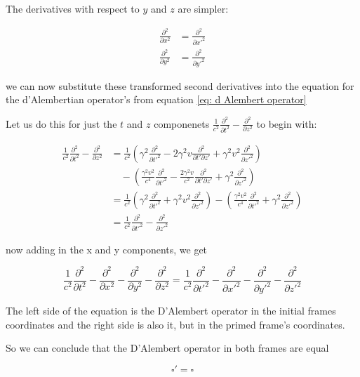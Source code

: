 \begin{derivation}
	The derivatives with respect to $y$ and $z$ are simpler:

	\begin{equation}
		\begin{aligned}
			\frac{\partial^2}{\partial x^2} & = \frac{\partial^2}{\partial x'^2} \\
			\frac{\partial^2}{\partial y^2} & = \frac{\partial^2}{\partial y'^2}
		\end{aligned}
	\end{equation}

	we can now substitute these transformed second derivatives into the equation for the d'Alembertian operator's from equation \eqref{eq: d Alembert operator}

	Let us do this for just the $t$ and $z$ componenets $\frac{1}{c^2}\frac{\partial^2}{\partial t^2} - \frac{\partial^2}{\partial z^2}$ to begin with:

	\begin{equation}
		\begin{aligned}
			\frac{1}{c^2}\frac{\partial^2}{\partial t^2} - \frac{\partial^2}{\partial z^2}
			 & = \frac{1}{c^2}\left(\gamma^2 \frac{\partial^2}{\partial t'^2} - 2\gamma^2 v \frac{\partial^2}{\partial t'\partial z'} + \gamma^2 v^2 \frac{\partial^2}{\partial z'^2}\right)                                                              \\
			 & \quad - \left(\frac{\gamma^2 v^2}{c^4} \frac{\partial^2}{\partial t'^2} - \frac{2\gamma^2 v}{c^2} \frac{\partial^2}{\partial t'\partial z'} + \gamma^2 \frac{\partial^2}{\partial z'^2}\right)                                             \\
			 & = \frac{1}{c^2}\left(\gamma^2 \frac{\partial^2}{\partial t'^2} + \gamma^2 v^2 \frac{\partial^2}{\partial z'^2}\right) - \left(\frac{\gamma^2 v^2}{c^4} \frac{\partial^2}{\partial t'^2} + \gamma^2 \frac{\partial^2}{\partial z'^2}\right) \\
			 & = \frac{1}{c^2} \frac{\partial^2}{\partial t'^2} - \frac{\partial^2}{\partial z'^2}
		\end{aligned}
	\end{equation}

	now adding in the x and y components, we get

	\begin{equation}
		\frac{1}{c^2}\frac{\partial^2}{\partial t^2} - \frac{\partial^2}{\partial x^2} - \frac{\partial^2}{\partial y^2} - \frac{\partial^2}{\partial z^2} = \frac{1}{c^2}\frac{\partial^2}{\partial t'^2} - \frac{\partial^2}{\partial x'^2} - \frac{\partial^2}{\partial y'^2} - \frac{\partial^2}{\partial z'^2}
	\end{equation}

	The left side of the equation is the D'Alembert operator in the initial frames coordinates and the right side is also it, but in the primed frame's coordinates.

	So we can conclude that the D'Alembert operator in both frames are equal

	\begin{equation}
	\square' = \square
	\end{equation}

\end{derivation}
